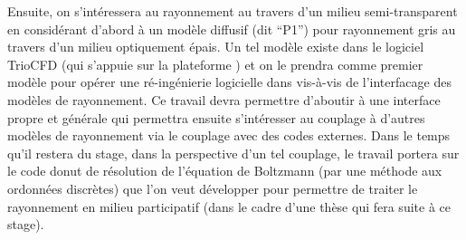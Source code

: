 Ensuite, on s’intéressera au rayonnement au travers d’un milieu semi-transparent en considérant d’abord à un modèle diffusif (dit “P1”) pour rayonnement gris au travers d’un milieu optiquement épais. Un tel modèle existe dans le logiciel TrioCFD (qui s’appuie sur la plateforme ) et on le prendra comme premier modèle pour opérer une ré-ingénierie logicielle dans  vis-à-vis de l’interfacage des modèles de rayonnement. Ce travail devra permettre d’aboutir à une interface propre et générale qui permettra ensuite s’intéresser au couplage à d’autres modèles de rayonnement via le couplage avec des codes externes. Dans le temps qu’il restera du stage, dans la perspective d’un tel couplage, le travail portera sur le code donut de résolution de l’équation de Boltzmann (par une méthode aux ordonnées discrètes) que l’on veut développer pour permettre de traiter le rayonnement en milieu participatif (dans le cadre d'une thèse qui fera suite à ce stage).
